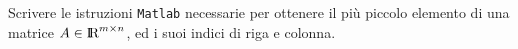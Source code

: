 Scrivere le istruzioni {\tt Matlab} necessarie per ottenere il pi\`u
piccolo elemento di una matrice $A\in \hbox{\rm I\kern-.2em\hbox{\rm R}}^{m\times n}$, ed i suoi indici di riga e colonna.

